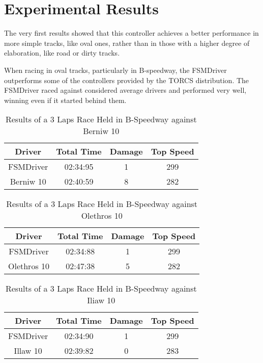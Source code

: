\section{Experimental Results}

The very first results showed that
this controller achieves a better performance in more simple tracks, like oval ones, rather than in those with a higher degree of elaboration, like road or dirty tracks.

When racing in oval tracks, particularly in B-speedway, the FSMDriver outperforms some of the controllers provided by the TORCS distribution. The FSMDriver raced against considered average drivers and performed very well, winning even if it started behind them.

\begin{table}[h]
\renewcommand{\arraystretch}{1.3}
\caption{Results of a 3 Laps Race Held in B-Speedway against Berniw 10}
\label{table_1}
\centering
\begin{tabular}{c||c||c||c}
\hline
\bfseries Driver & \bfseries Total Time & \bfseries Damage & \bfseries Top Speed \\ 
\hline
\hline FSMDriver & 02:34:95 & 1 & 299 \\ 
\hline Berniw 10 & 02:40:59 & 8 & 282 \\ 
\hline 
\end{tabular}
\end{table}

\begin{table}[h]
\renewcommand{\arraystretch}{1.3}
\caption{Results of a 3 Laps Race Held in B-Speedway against Olethros 10}
\label{table_2}
\centering
\begin{tabular}{c||c||c||c}
\hline
\bfseries Driver & \bfseries Total Time & \bfseries Damage & \bfseries Top Speed \\ 
\hline
\hline FSMDriver & 02:34:88 & 1 & 299 \\ 
\hline Olethros 10 & 02:47:38 & 5 & 282 \\ 
\hline 
\end{tabular}
\end{table}

\begin{table}[h]
\renewcommand{\arraystretch}{1.3}
\caption{Results of a 3 Laps Race Held in B-Speedway against Iliaw 10}
\label{table_3}
\centering
\begin{tabular}{c||c||c||c}
\hline
\bfseries Driver & \bfseries Total Time & \bfseries Damage & \bfseries Top Speed \\ 
\hline
\hline FSMDriver & 02:34:90 & 1 & 299 \\ 
\hline Illaw 10 & 02:39:82 & 0 & 283 \\ 
\hline 
\end{tabular}
\end{table}



